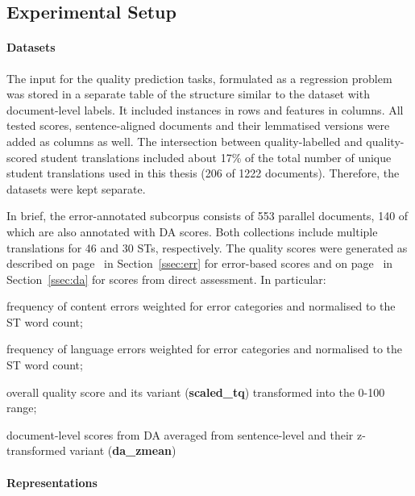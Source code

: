 \subsection{\label{ssec:my_doc_regressors}Experimental Setup}

\paragraph{Datasets} 
The input for the quality prediction tasks, formulated as a regression problem was stored in a separate table of the structure similar to the dataset with document-level labels. It included instances in rows and features in columns. All tested scores, sentence-aligned documents and their lemmatised versions were added as columns as well. 
The intersection between quality-labelled and quality-scored student translations included about 17\% of the total number of unique student translations used in this thesis (206 of 1222 documents). 
Therefore, the datasets were kept separate.

In brief, the error-annotated subcorpus consists of 553 parallel documents, 140 of which are also annotated with DA scores. Both collections include multiple translations for 46 and 30 STs, respectively.
The quality scores were generated as described on page~\pageref{pg:tq} in Section~\ref{ssec:err} for error-based scores and on page~\pageref{pg:final_da} in Section~\ref{ssec:da} for scores from direct assessment. 
In particular:
\begin{description}\compresslist{}
	\item[accuracy:] frequency of content errors weighted for error categories and normalised to the ST word count;
	\item[fluency:] frequency of language errors weighted for error categories and normalised to the ST word count;
	\item[tq:] overall quality score and its variant (\textbf{scaled\_tq}) transformed into the 0-100 range;
	\item[da\_mean:] document-level scores from DA averaged from sentence-level and their z-transformed variant (\textbf{da\_zmean})
\end{description}

\paragraph{Representations}

